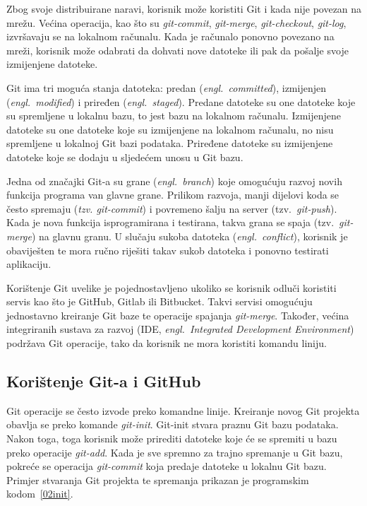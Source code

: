Zbog svoje distribuirane naravi, korisnik može koristiti Git i kada nije povezan na mrežu. Većina
operacija, kao što su \textit{git-commit}, \textit{git-merge}, \textit{git-checkout},
\textit{git-log}, izvršavaju se na lokalnom računalu. Kada je računalo ponovno povezano na mreži,
korisnik može odabrati da dohvati nove datoteke ili pak da pošalje svoje izmijenjene datoteke.

Git ima tri moguća stanja datoteka: predan (\textit{engl.~committed}), izmijenjen
(\textit{engl.~modified}) i priređen (\textit{engl.~staged}). Predane datoteke su one datoteke koje
su spremljene u lokalnu bazu, to jest bazu na lokalnom računalu. Izmijenjene datoteke su one
datoteke koje su izmijenjene na lokalnom računalu, no nisu spremljene u lokalnoj Git bazi podataka.
Priređene datoteke su izmijenjene datoteke koje se dodaju u sljedećem unosu u Git bazu.

Jedna od značajki Git-a su grane (\textit{engl.~branch}) koje omogućuju razvoj novih funkcija
programa van glavne grane. Prilikom razvoja, manji dijelovi koda se često spremaju (\textit{tzv.
git-commit}) i povremeno šalju na server (tzv.~\textit{git-push}). Kada je nova funkcija
isprogramirana i testirana, takva grana se spaja (tzv.~\textit{git-merge}) na glavnu granu. U
slučaju sukoba datoteka (\textit{engl.~conflict}), korisnik je obaviješten te mora ručno riješiti
takav sukob datoteka i ponovno testirati aplikaciju.

Korištenje Git uvelike je pojednostavljeno ukoliko se korisnik odluči koristiti servis kao što je
GitHub, Gitlab ili Bitbucket. Takvi servisi omogućuju jednostavno kreiranje Git baze te operacije
spajanja \textit{git-merge}. Također, većina integriranih sustava za razvoj (IDE,
\textit{engl.~Integrated Development Environment}) podržava Git operacije, tako da korisnik ne mora
koristiti komandu liniju.

\subsection{Korištenje Git-a i GitHub} Git operacije se često izvode preko komandne linije.
Kreiranje novog Git projekta obavlja se preko komande \textit{git-init}. Git-init stvara praznu Git
bazu podataka. Nakon toga, toga korisnik može prirediti datoteke koje će se spremiti u bazu preko
operacije \textit{git-add}. Kada je sve spremno za trajno spremanje u Git bazu, pokreće se operacija
\textit{git-commit} koja predaje datoteke u lokalnu Git bazu. Primjer stvaranja Git projekta te
spremanja prikazan je programskim kodom~\ref{02init}.

